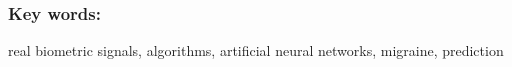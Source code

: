 
\thispagestyle{empty} 
 








\vspace*{0.5cm} 


\subsubsection*{Key  words:} real biometric  signals, algorithms, artificial neural networks, migraine, prediction 
 
\clearpage 
\thispagestyle{empty}

